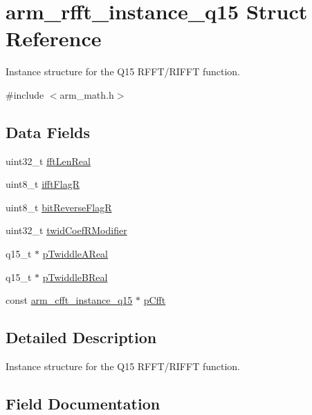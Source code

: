 \hypertarget{structarm__rfft__instance__q15}{}\section{arm\+\_\+rfft\+\_\+instance\+\_\+q15 Struct Reference}
\label{structarm__rfft__instance__q15}


Instance structure for the Q15 R\+F\+F\+T/\+R\+I\+F\+FT function.  




{\ttfamily \#include $<$arm\+\_\+math.\+h$>$}

\subsection*{Data Fields}
\begin{DoxyCompactItemize}
\item 
uint32\+\_\+t \mbox{\hyperlink{structarm__rfft__instance__q15_adf0d4604cf5546075d9d4cf122d6c986}{fft\+Len\+Real}}
\item 
uint8\+\_\+t \mbox{\hyperlink{structarm__rfft__instance__q15_a787d72055c89e4d62b188d6bd646341c}{ifft\+FlagR}}
\item 
uint8\+\_\+t \mbox{\hyperlink{structarm__rfft__instance__q15_ad56ec2425e2422108b8767b43d944591}{bit\+Reverse\+FlagR}}
\item 
uint32\+\_\+t \mbox{\hyperlink{structarm__rfft__instance__q15_a5b06f7f76c018db993fe6acc5708c589}{twid\+Coef\+R\+Modifier}}
\item 
q15\+\_\+t $\ast$ \mbox{\hyperlink{structarm__rfft__instance__q15_ac17beaa033ab1ea242d49037276b67e2}{p\+Twiddle\+A\+Real}}
\item 
q15\+\_\+t $\ast$ \mbox{\hyperlink{structarm__rfft__instance__q15_a67a618de57c3a7420ee05fda1a80bf3a}{p\+Twiddle\+B\+Real}}
\item 
const \mbox{\hyperlink{structarm__cfft__instance__q15}{arm\+\_\+cfft\+\_\+instance\+\_\+q15}} $\ast$ \mbox{\hyperlink{structarm__rfft__instance__q15_abd0c3c04ec88379f48e51447e95f092a}{p\+Cfft}}
\end{DoxyCompactItemize}


\subsection{Detailed Description}
Instance structure for the Q15 R\+F\+F\+T/\+R\+I\+F\+FT function. 

\subsection{Field Documentation}
\mbox{\label{structarm__rfft__instance__q15_ad56ec2425e2422108b8767b43d944591}} 
